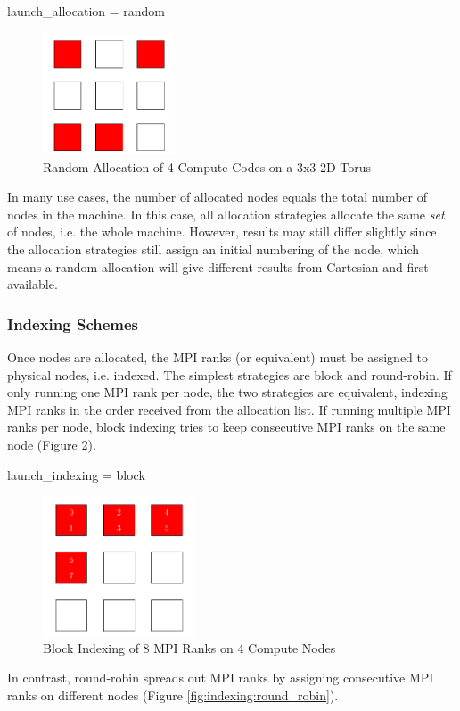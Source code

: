 \begin{ViFile}
launch_allocation = random
\end{ViFile}
\begin{figure}[h]
\centering
\includegraphics[width=0.35\textwidth]{figures/tikz/allocation/random.pdf}
\caption{Random Allocation of 4 Compute Codes on a 3x3 2D Torus}
\label{fig:allocation:random}
\end{figure}

In many use cases, the number of allocated nodes equals the total number of nodes in the machine.
In this case, all allocation strategies allocate the same \emph{set} of nodes, i.e. the whole machine.
However, results may still differ slightly since the allocation strategies still assign an initial numbering of the node,
which means a random allocation will give different results from Cartesian and first available.


\subsubsection{Indexing Schemes}
\label{subsec:tutorial:indexing}
Once nodes are allocated, the MPI ranks (or equivalent) must be assigned to physical nodes, i.e. indexed.
The simplest strategies are block and round-robin.  If only running one MPI rank per node, the two strategies are equivalent,
indexing MPI ranks in the order received from the allocation list.
If running multiple MPI ranks per node, block indexing tries to keep consecutive MPI ranks on the same node (Figure \ref{fig:indexing:block}).

\begin{ViFile}
launch_indexing = block
\end{ViFile}
\begin{figure}[h]
\centering
\includegraphics[width=0.4\textwidth]{figures/tikz/indexing/block.pdf}
\caption{Block Indexing of 8 MPI Ranks on 4 Compute Nodes}
\label{fig:indexing:block}
\end{figure}
In contrast, round-robin spreads out MPI ranks by assigning consecutive MPI ranks on different nodes (Figure \ref{fig:indexing:round_robin}).

